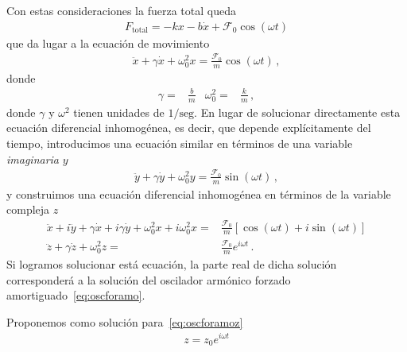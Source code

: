 Con estas consideraciones la fuerza total queda
\begin{align*}
  F_{\text{total}}=-k x -b\dot x+\mathcal{F}_0\cos(\omega t)
\end{align*}
que da lugar a la ecuación de movimiento
\begin{align}
  \label{eq:oscforamo}
  \ddot x+\gamma \dot x+\omega_0^2 x=\frac{\mathcal{F}_0}{m}\cos(\omega t)\,,
\end{align}
donde
\begin{align*}
  \gamma=&\frac{b}{m}&\omega_0^2=&\frac{k}{m}\,,
\end{align*}
donde $\gamma$ y $\omega^2$ tienen unidades de $1/\text{seg}$. En lugar de solucionar directamente esta ecuación diferencial inhomogénea, es decir, que depende explícitamente del tiempo, introducimos una ecuación similar en términos de una variable \emph{imaginaria} $y$
\begin{align*}
    \ddot y+\gamma \dot y+\omega_0^2 y=\frac{\mathcal{F}_0}{m}\sin(\omega t)\,,
\end{align*}
y construimos una ecuación diferencial inhomogénea en términos de la variable compleja $z$
\begin{align}
  \label{eq:oscforamoz}
   \ddot x+i\ddot y+\gamma \dot x+i\gamma \dot y+\omega_0^2 x+i\omega_0^2 x=&
   \frac{\mathcal{F}_0}{m}\left[\cos(\omega t)+i\sin(\omega t)\right]\nonumber\\
    \ddot z+\gamma \dot z+\omega_0^2 z=&\frac{\mathcal{F}_0}{m}e^{i\omega t}\,.
\end{align}
Si logramos solucionar está ecuación, la parte real de dicha solución corresponderá a la solución del oscilador armónico forzado amortiguado~\eqref{eq:oscforamo}.

Proponemos como solución para~\eqref{eq:oscforamoz}
\begin{align}
  \label{eq:propsol}
  z=z_0 e^{i\omega t}
\end{align}

